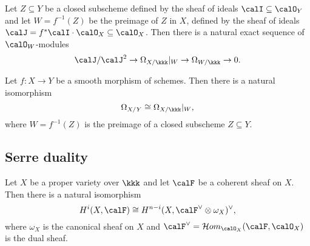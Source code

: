     \begin{theorem}\label{thm:the_second_fundamental_sequence_of_differentials}
        Let \(Z \subseteq Y\) be a closed subscheme defined by the sheaf of ideals \(\calI \subseteq \calO_Y\) and let \(W = f^{-1}(Z)\) be the preimage of \(Z\) in \(X\), defined by the sheaf of ideals \(\calJ = f^*\calI \cdot \calO_X \subseteq \calO_X\).
        Then there is a natural exact sequence of \(\calO_W\)-modules
        \[
            \calJ/\calJ^2 \to \Omega_{X/\kkk}|_W \to \Omega_{W/\kkk} \to 0.
        \]
    \end{theorem}

    \begin{theorem}\label{thm:adjunction_formula_smooth_case}
        Let \(f: X \to Y\) be a smooth morphism of schemes. Then there is a natural isomorphism
        \[
            \Omega_{X/Y} \cong \Omega_{X/\kkk}|_W,
        \]
        where \(W = f^{-1}(Z)\) is the preimage of a closed subscheme \(Z \subseteq Y\).
    \end{theorem}

\subsection{Serre duality}

    \begin{theorem}\label{thm:Serre_duality}
        Let \(X\) be a proper variety over \(\kkk\) and let \(\calF\) be a coherent sheaf on \(X\).
        Then there is a natural isomorphism
        \[
            H^i(X, \calF) \cong H^{n-i}(X, \calF^\vee \otimes \omega_X)^\vee,
        \]
        where \(\omega_X\) is the canonical sheaf on \(X\) and \(\calF^\vee = \mathcal{H}om_{\calO_X}(\calF, \calO_X)\) is the dual sheaf.
    \end{theorem}
